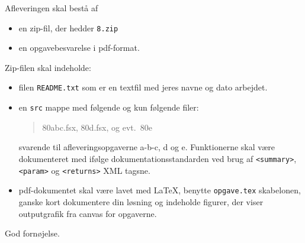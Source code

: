 \documentclass[a4paper,12pt]{article}
\newcommand{\exerciseNumber}{8}
\begin{document}
Afleveringen skal bestå af
\begin{itemize}
  \item en zip-fil, der hedder \texttt{\exerciseNumber\typeLetter.zip}
  \item en opgavebesvarelse i pdf-format.
\end{itemize}
Zip-filen skal indeholde:
\begin{itemize}
\item filen \texttt{README.txt} som er en textfil med jeres navne og dato arbejdet.
\item en \texttt{src} mappe med følgende og kun
  følgende filer:
  \begin{quote}
    \exerciseNumber\typeLetter0abc.fsx, \exerciseNumber\typeLetter0d.fsx, og evt.\ \exerciseNumber\typeLetter0e
  \end{quote}
  svarende til afleveringsopgaverne a-b-c, d og e. Funktionerne skal være dokumenteret med ifølge dokumentationsstandarden ved brug af \verb|<summary>|, \verb|<param>| og \verb|<returns>| XML tagsne.
  \item pdf-dokumentet skal være lavet med \LaTeX, benytte \lstinline[language=console]{opgave.tex} skabelonen, ganske kort dokumentere din løsning og indeholde figurer, der viser outputgrafik fra canvas for opgaverne.
\end{itemize}

\flushright God fornøjelse.
\end{document}
